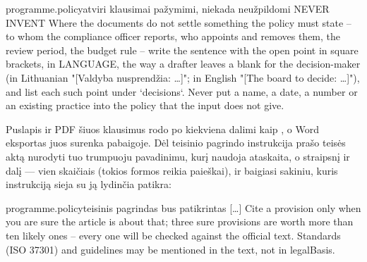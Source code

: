 \begin{promptexcerpt}{programme.policy}{atviri klausimai pažymimi, niekada neužpildomi}
NEVER INVENT
Where the documents do not settle something the policy must state – to whom the compliance officer reports, who appoints and removes them, the review period, the budget rule – write the sentence with the open point in square brackets, in {LANGUAGE}, the way a drafter leaves a blank for the decision-maker (in Lithuanian "[Valdyba nusprendžia: …]"; in English "[The board to decide: …]"), and list each such point under `decisions`. Never put a name, a date, a number or an existing practice into the policy that the input does not give.
\end{promptexcerpt}

Puslapis ir PDF šiuos klausimus rodo po kiekviena dalimi kaip , o
Word eksportas juos surenka pabaigoje. Dėl teisinio pagrindo instrukcija prašo teisės aktą
nurodyti tuo trumpuoju pavadinimu, kurį naudoja ataskaita, o straipsnį ir dalį --- vien
skaičiais (tokios formos reikia paieškai), ir baigiasi sakiniu, kuris instrukciją sieja su ją
lydinčia patikra:

\begin{promptexcerpt}{programme.policy}{teisinis pagrindas bus patikrintas}
[…]
Cite a provision only when you are sure the article is about that; three sure provisions are worth more than ten likely ones – every one will be checked against the official text. Standards (ISO 37301) and guidelines may be mentioned in the text, not in legalBasis.
\end{promptexcerpt}

